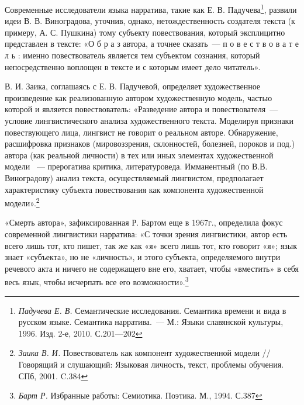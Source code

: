 \documentclass{kursa4}
\begin{document}
      Современные исследователи языка нарратива, такие как Е. В. Падучева\footnote{\textit{{Падучева Е. В. }}{Семантические исследования. Семантика времени и вида в русском языке. Семантика нарратива.~--- М.: Языки славянской культуры, 1996. Изд. 2-е, 2010. С.201—202}}, развили идеи В. В. Виноградова, уточнив, однако, нетождественность создателя текста (к примеру, А. С. Пушкина) тому субъекту повествования, который эксплицитно представлен в тексте:\newline
      «О б р а з автора, а точнее сказать~--- п о в е с т в о в а т е л ь : именно повествователь является тем субъектом сознания, который непосредственно воплощен в тексте и с которым имеет дело читатель». 

      В. И. Заика, соглашаясь с Е. В. Падучевой, определяет художественное произведение как реализованную автором художественную модель, частью которой и является повествователь: «Разведение автора и повествователя~--- условие лингвистического анализа художественного текста. Моделируя признаки повествующего лица, лингвист не говорит о реальном авторе. Обнаружение, расшифровка признаков (мировоззрения, склонностей, болезней, пороков и под.) автора (как реальной личности) в тех или иных элементах художественной модели ~--- прерогатива критика, литературоведа. Имманентный (по В.В. Виноградову) анализ текста, осуществляемый лингвистом, предполагает характеристику субъекта повествования как компонента художественной модели».\footnote{\textit{{Заика В. И. }}{Повествователь как компонент художественной модели //Говорящий и слушающий: Языковая личность, текст, проблемы обучения. СПб, 2001. C.384}}

      «Смерть автора», зафиксированная Р. Бартом еще в 1967г., определила фокус современной лингвистики нарратива:\newline
      «С точки зрения лингвистики, автор есть всего лишь тот, кто пишет, так же как «я» всего лишь тот, кто говорит «я»; язык знает «субъекта», но не «личность», и этого субъекта, определяемого внутри речевого акта и ничего не содержащего вне его, хватает, чтобы «вместить» в себя весь язык, чтобы исчерпать все его возможности».\footnote{\textit{{Барт Р.}}{ Избранные работы: Семиотика. Поэтика. М., 1994. С.387}}
\end{document}

